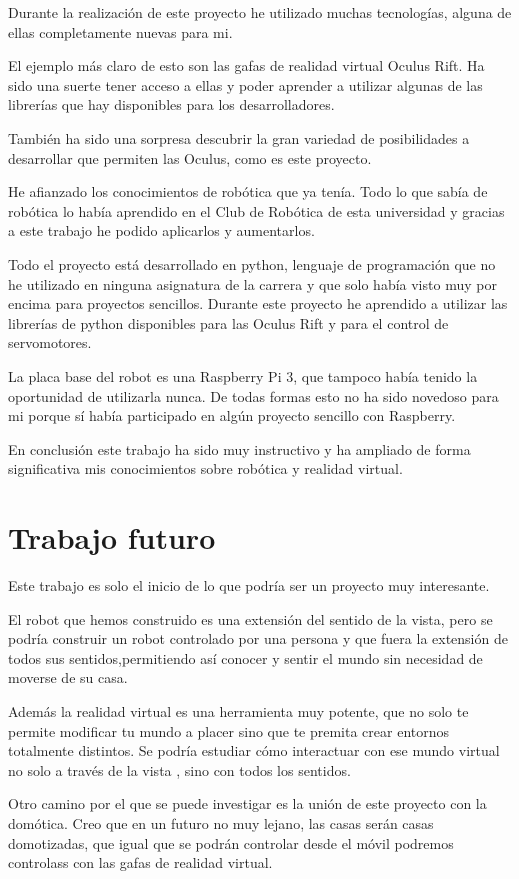 \documentclass[twoside, 12pt]{epstfg}
\begin{document}
Durante la realización de este proyecto he utilizado muchas tecnologías, alguna de ellas completamente nuevas para mi.

El ejemplo más claro de esto son las gafas de realidad virtual Oculus Rift. Ha sido una suerte tener acceso a ellas y poder aprender a utilizar algunas de las librerías que hay disponibles para los desarrolladores.

También ha sido una sorpresa descubrir la gran variedad de posibilidades a desarrollar que permiten las Oculus, como es este proyecto.

He afianzado los conocimientos de robótica que ya tenía. Todo lo que sabía de robótica lo había aprendido en el Club de Robótica de esta universidad y gracias a este trabajo he podido aplicarlos y aumentarlos.

Todo el proyecto está desarrollado en python, lenguaje de programación que no he utilizado en ninguna asignatura de la carrera y que solo había visto muy por encima para proyectos sencillos.
Durante este proyecto he aprendido a utilizar las librerías de python disponibles para las Oculus Rift y para el control de servomotores.

La placa base del robot es una Raspberry Pi 3, que tampoco había tenido la oportunidad de utilizarla nunca. De todas formas esto no ha sido novedoso para mi porque sí había participado en algún proyecto sencillo con Raspberry.

En conclusión este trabajo ha sido muy instructivo y ha ampliado de forma significativa mis conocimientos sobre robótica y realidad virtual.



\section{Trabajo futuro}
Este trabajo es solo el inicio de lo que podría ser un proyecto muy interesante.

El robot que hemos construido es una extensión del sentido de la vista, pero se podría construir un robot controlado por una persona y que fuera la extensión de todos sus sentidos,permitiendo así conocer y sentir el mundo sin necesidad de moverse de su casa.

Además la realidad virtual es una herramienta muy potente, que no solo te permite modificar tu mundo a placer sino que te premita crear entornos totalmente distintos. Se podría estudiar cómo interactuar con ese mundo virtual no solo a través de la vista , sino con todos los sentidos.

Otro camino por el que se puede investigar es la unión de este proyecto con la domótica.
Creo que en un futuro no muy lejano, las casas serán casas domotizadas, que igual que se podrán controlar desde el móvil podremos controlass con las gafas de realidad virtual.

\backmatter
\appendix

\cleardoublepage

\nocite{*}
{}

\cleardoublepage
\printindex
\end{document}
